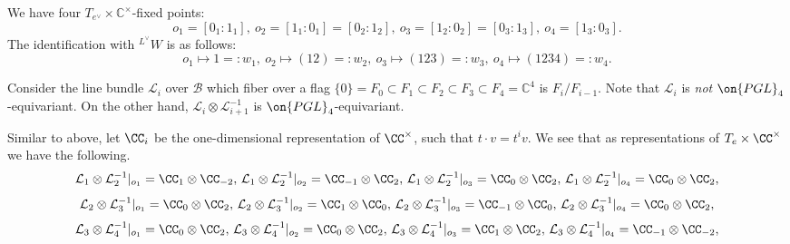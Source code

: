 \documentclass[12pt]{amsart}
\begin{document}
    We have four $T_{e^\vee} \times \mathbb{C}^\times$-fixed points:
\begin{equation*}
o_1=[0_1:1_1],~o_2=[1_1:0_1]=[0_2:1_2],~o_3=[1_2:0_2]=[0_3:1_3],~o_4=[1_3:0_3].
\end{equation*}
The identification with ${}^{L^\vee}W$ is as follows:
\begin{equation*}
o_1 \mapsto 1=:w_1,~o_2 \mapsto (12)=:w_2,~o_3 \mapsto (123)=:w_3,~o_4 \mapsto (1234)=:w_4. 
\end{equation*}



    
    
Consider the line bundle $\mathcal{L}_i$ over $\mathcal{B}$ which fiber  over a flag $\{0\}=F_0 \subset F_1 \subset F_2 \subset F_3 \subset F_4=\mathbb{C}^4$ is $F_i/F_{i-1}$. Note that $\mathcal{L}_i$ is {\emph{not}} $\on{PGL}_4$-equivariant. On the other hand, $\mathcal{L}_i \otimes \mathcal{L}_{i+1}^{-1}$ is $\on{PGL}_4$-equivariant. 

 Similar to above, let $\CC_i$ be the one-dimensional representation of $\CC^\times$, such that $t\cdot v = t^i v$. We see that as representations of $T_e\times \CC^{\times}$ we have the following. 
 \begin{equation*}
 \mathcal{L}_1 \otimes \mathcal{L}_2^{-1}|_{o_1} = \CC_{1} \otimes \CC_{-2}, \,  \mathcal{L}_1 \otimes \mathcal{L}_2^{-1}|_{o_2} = \CC_{-1} \otimes \CC_{2}, \, \mathcal{L}_1 \otimes \mathcal{L}_2^{-1}|_{o_3} = \CC_{0} \otimes \CC_{2}, \,\mathcal{L}_1 \otimes \mathcal{L}_2^{-1}|_{o_4} = \CC_{0} \otimes \CC_{2},
 \end{equation*} 
  \begin{equation*}
 \mathcal{L}_2 \otimes \mathcal{L}_3^{-1}|_{o_1} = \CC_{0} \otimes \CC_{2}, \,  \mathcal{L}_2 \otimes \mathcal{L}_3^{-1}|_{o_2} = \CC_{1} \otimes \CC_{0}, \, \mathcal{L}_2 \otimes \mathcal{L}_3^{-1}|_{o_3} = \CC_{-1} \otimes \CC_{0}, \,\mathcal{L}_2 \otimes \mathcal{L}_3^{-1}|_{o_4} = \CC_{0} \otimes \CC_{2},
 \end{equation*} 
  \begin{equation*}
 \mathcal{L}_3 \otimes \mathcal{L}_4^{-1}|_{o_1} = \CC_{0} \otimes \CC_{2}, \,  \mathcal{L}_3 \otimes \mathcal{L}_{4}^{-1}|_{o_2} = \CC_{0} \otimes \CC_{2}, \, \mathcal{L}_3 \otimes \mathcal{L}_4^{-1}|_{o_3} = \CC_{1} \otimes \CC_{2}, \,\mathcal{L}_3 \otimes \mathcal{L}_4^{-1}|_{o_4} = \CC_{-1} \otimes \CC_{-2},
 \end{equation*} 
\end{document}
